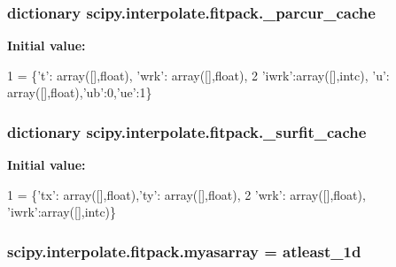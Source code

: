 \hypertarget{namespacescipy_1_1interpolate_1_1fitpack_a3793e6fff4a587159825ea08f6687c8f}{}
\subsubsection[{\+\_\+parcur\+\_\+cache}]{\setlength{\rightskip}{0pt plus 5cm}dictionary scipy.\+interpolate.\+fitpack.\+\_\+parcur\+\_\+cache}\label{namespacescipy_1_1interpolate_1_1fitpack_a3793e6fff4a587159825ea08f6687c8f}
{\bfseries Initial value\+:}
\begin{DoxyCode}
1 = \{\textcolor{stringliteral}{'t'}: array([],float), \textcolor{stringliteral}{'wrk'}: array([],float),
2                  \textcolor{stringliteral}{'iwrk'}:array([],intc), \textcolor{stringliteral}{'}\textcolor{stringliteral}{u': array([],float),'}ub':0,'ue':1\}
\end{DoxyCode}
\hypertarget{namespacescipy_1_1interpolate_1_1fitpack_addb72cc2d4e6140eb233f29c2d19fc7c}{}
\subsubsection[{\+\_\+surfit\+\_\+cache}]{\setlength{\rightskip}{0pt plus 5cm}dictionary scipy.\+interpolate.\+fitpack.\+\_\+surfit\+\_\+cache}\label{namespacescipy_1_1interpolate_1_1fitpack_addb72cc2d4e6140eb233f29c2d19fc7c}
{\bfseries Initial value\+:}
\begin{DoxyCode}
1 = \{\textcolor{stringliteral}{'tx'}: array([],float),\textcolor{stringliteral}{'ty'}: array([],float),
2                  \textcolor{stringliteral}{'wrk'}: array([],float), \textcolor{stringliteral}{'iwrk'}:array([],intc)\}
\end{DoxyCode}
\hypertarget{namespacescipy_1_1interpolate_1_1fitpack_a4ad199da16b4d798a68f31962ef1ea64}{}
\subsubsection[{myasarray}]{\setlength{\rightskip}{0pt plus 5cm}scipy.\+interpolate.\+fitpack.\+myasarray = atleast\+\_\+1d}\label{namespacescipy_1_1interpolate_1_1fitpack_a4ad199da16b4d798a68f31962ef1ea64}

